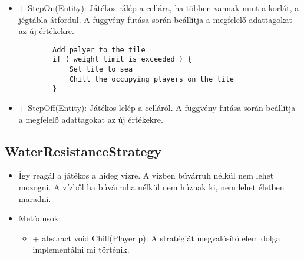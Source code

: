 \begin{itemize}
\begin{itemize}
		\item + StepOn(Entity): Játékos rálép a cellára, ha többen vannak mint a korlát, a jégtábla átfordul. A függvény futása során beállítja a megfelelő adattagokat az új értékekre.
		\begin{lstlisting}
		Add palyer to the tile
		if ( weight limit is exceeded ) {
			Set tile to sea
			Chill the occupying players on the tile
		}
		\end{lstlisting}
		\item + StepOff(Entity): Játékos lelép a celláról. A függvény futása során beállítja a megfelelő adattagokat az új értékekre.
	\end{itemize}
\end{itemize}

\subsection{WaterResistanceStrategy}
\begin{itemize}
	\item Így reagál a játékos a hideg vízre. A vízben búvárruh nélkül nem lehet mozogni. A vízből ha búvárruha nélkül nem húznak ki, nem lehet életben maradni.
	\item Metódusok:
	\begin{itemize}
		\item + abstract void Chill(Player p): A stratégiát megvalósító elem dolga implementálni mi történik.
	\end{itemize}
\end{itemize}

